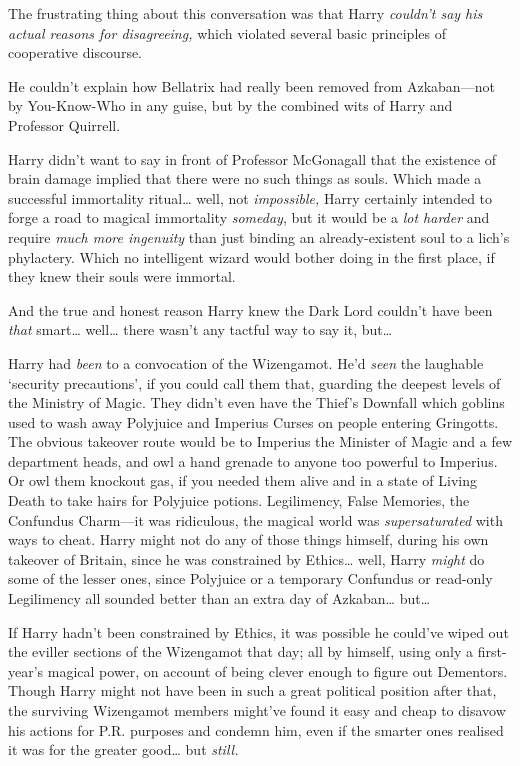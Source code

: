 The frustrating thing about this conversation was that Harry
\emph{couldn't say his actual reasons for disagreeing,} which violated
several basic principles of cooperative discourse.

He couldn't explain how Bellatrix had really been removed from
Azkaban---not by You-Know-Who in any guise, but by the combined wits of
Harry and Professor Quirrell.

Harry didn't want to say in front of Professor McGonagall that the
existence of brain damage implied that there were no such things as
souls. Which made a successful immortality ritual\ldots{} well, not
\emph{impossible,} Harry certainly intended to forge a road to magical
immortality \emph{someday}, but it would be a \emph{lot harder} and
require \emph{much more ingenuity} than just binding an already-existent
soul to a lich's phylactery. Which no intelligent wizard would bother
doing in the first place, if they knew their souls were immortal.

And the true and honest reason Harry knew the Dark Lord couldn't have
been \emph{that} smart\ldots{} well\ldots{} there wasn't any tactful way
to say it, but\ldots{}

Harry had \emph{been} to a convocation of the Wizengamot. He'd
\emph{seen} the laughable `security precautions', if you could call them
that, guarding the deepest levels of the Ministry of Magic. They didn't
even have the Thief's Downfall which goblins used to wash away Polyjuice
and Imperius Curses on people entering Gringotts. The obvious takeover
route would be to Imperius the Minister of Magic and a few department
heads, and owl a hand grenade to anyone too powerful to Imperius. Or owl
them knockout gas, if you needed them alive and in a state of Living
Death to take hairs for Polyjuice potions. Legilimency, False Memories,
the Confundus Charm---it was ridiculous, the magical world was
\emph{supersaturated} with ways to cheat. Harry might not do any of
those things himself, during his own takeover of Britain, since he was
constrained by Ethics\ldots{} well, Harry \emph{might} do some of the
lesser ones, since Polyjuice or a temporary Confundus or read-only
Legilimency all sounded better than an extra day of Azkaban\ldots{}
but\ldots{}

If Harry hadn't been constrained by Ethics, it was possible he could've
wiped out the eviller sections of the Wizengamot that day; all by
himself, using only a first-year's magical power, on account of being
clever enough to figure out Dementors. Though Harry might not have been
in such a great political position after that, the surviving Wizengamot
members might've found it easy and cheap to disavow his actions for P.R.
purposes and condemn him, even if the smarter ones realised it was for
the greater good\ldots{} but \emph{still.}

